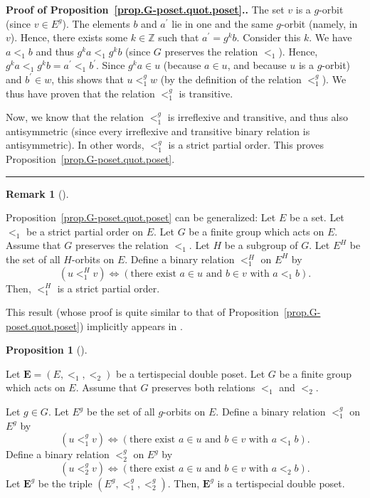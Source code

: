 \documentclass[numbers=enddot,12pt,final,onecolumn,notitlepage,abstracton]{scrartcl}
\theoremstyle{definition}
\newtheorem{prop}[theo]{Proposition}
\newenvironment{proposition}[1][]
{\begin{prop}[#1]\begin{leftbar}}
{\end{leftbar}\end{prop}}
\newtheorem{remk}[theo]{Remark}
\newenvironment{remark}[1][]
{\begin{remk}[#1]\begin{leftbar}}
{\end{leftbar}\end{remk}}
\newenvironment{proof}[1][Proof]{\noindent\textbf{#1.} }{\ \rule{0.5em}{0.5em}}
\newcommand{\EE}{{\mathbf{E}}}
\begin{document}
\begin{proof}[Proof of Proposition~\ref{prop.G-poset.quot.poset}.]
The set $v$ is a $g$-orbit (since $v \in E^g$).
The elements $b$ and $a^{\prime}$ lie in one and the same $g$-orbit (namely,
in $v$). Hence, there exists some $k\in\mathbb{Z}$ such that $a^{\prime}
=g^{k}b$. Consider this $k$. We have $a<_{1}b$ and thus $g^{k}a<_{1}g^{k}b$
(since $G$ preserves the relation $<_{1}$). Hence,
$g^{k}a<_{1}g^{k}b=a^{\prime}<_{1}b^{\prime}$.
Since $g^{k}a\in u$ (because $a\in u$, and because $u$ is a
$g$-orbit) and $b^{\prime}\in w$, this shows that $u<_{1}^{g}w$
(by the definition of the relation $<_{1}^{g}$).
We thus have proven that the
relation $<_{1}^{g}$ is transitive.

Now, we know that the relation $<_{1}^{g}$ is irreflexive and transitive, and
thus also antisymmetric (since every irreflexive and transitive binary
relation is antisymmetric). In other words, $<_{1}^{g}$ is a strict partial
order. This proves Proposition~\ref{prop.G-poset.quot.poset}.
\end{proof}

\begin{remark}
Proposition~\ref{prop.G-poset.quot.poset} can be generalized:
Let $E$ be a set. Let $<_1$ be a strict partial order on $E$.
Let $G$ be a finite group which acts on $E$. Assume that $G$ preserves
the relation $<_1$. Let $H$ be a subgroup of $G$.
Let $E^H$ be the set of all $H$-orbits on $E$.
Define a binary relation $<_{1}^H$ on $E^H$ by
\[
\left(  u<_{1}^H v\right)  \Longleftrightarrow\left(  \text{there exist }a\in
u\text{ and }b\in v\text{ with }a<_{1}b\right)  .
\]
Then, $<_1^H$ is a strict partial order.

This result (whose proof is quite similar to that of
Proposition~\ref{prop.G-poset.quot.poset}) implicitly appears in
\cite[p. 30]{Stanley-Peck}.
\end{remark}

\begin{proposition}
\label{prop.G-poset.quot.double}
Let $\EE = \left(E, <_1, <_2\right)$ be a tertispecial double poset.
Let $G$ be a finite group which acts on $E$. Assume that $G$ preserves
both relations $<_1$ and $<_2$.

Let $g \in G$. Let $E^g$ be the set of all $g$-orbits
on $E$. Define a binary relation $<_{1}^{g}$ on $E^{g}$ by
\[
\left(  u<_{1}^{g}v\right)  \Longleftrightarrow\left(  \text{there exist }a\in
u\text{ and }b\in v\text{ with }a<_{1}b\right)  .
\]
Define a binary relation $<_{2}^{g}$ on $E^{g}$ by
\[
\left(  u<_{2}^{g}v\right)  \Longleftrightarrow\left(  \text{there exist }a\in
u\text{ and }b\in v\text{ with }a<_{2}b\right)  .
\]
Let $\EE^g$ be the triple $\left(E^g, <_1^g, <_2^g\right)$. Then,
$\EE^g$ is a tertispecial double poset.
\end{proposition}
\end{document}
